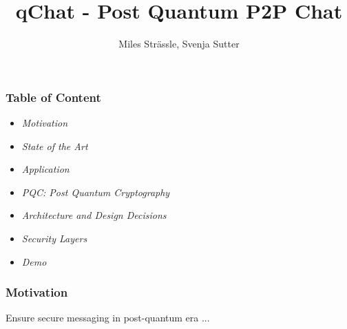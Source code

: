 \documentclass{beamer}
\title[qChat - Post Quantum P2P Chat]{qChat - Post Quantum P2P Chat}
\author{Miles Strässle, Svenja Sutter}
\institute{OST – Ostschweizer Fachhochschule}
\begin{document}
\frame{\titlepage}

\begin{frame}
	\frametitle{Table of Content}
	\begin{itemize}
		\item \textit{Motivation}
		\item \textit{State of the Art}
		\item \textit{Application}
		\item \textit{PQC: Post Quantum Cryptography}
		\item \textit{Architecture and Design Decisions}
		\item \textit{Security Layers}
		\item \textit{Demo}
	\end{itemize}
\end{frame}

\begin{frame}
	\frametitle{Motivation}
	Ensure secure messaging in post-quantum era ...
\end{frame}
\end{document}
